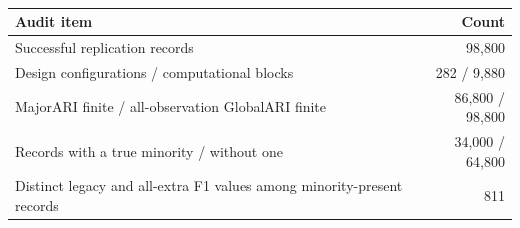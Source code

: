 \begin{table}[!htbp]
\caption{}
\label{tab:c1-tier1-audit}
\centering\footnotesize
\begin{tabularx}{\linewidth}{Xr}
\toprule
\rowcolor{RevisionBackground} Audit item & Count \\
\midrule
\rowcolor{RevisionBackground} Successful replication records & 98,800 \\
\rowcolor{RevisionBackground} Design configurations / computational blocks & 282 / 9,880 \\
\rowcolor{RevisionBackground} MajorARI finite / all-observation GlobalARI finite & 86,800 / 98,800 \\
\rowcolor{RevisionBackground} Records with a true minority / without one & 34,000 / 64,800 \\
\rowcolor{RevisionBackground} Distinct legacy and all-extra F1 values among minority-present records & 811 \\
\bottomrule
\end{tabularx}
\end{table}
